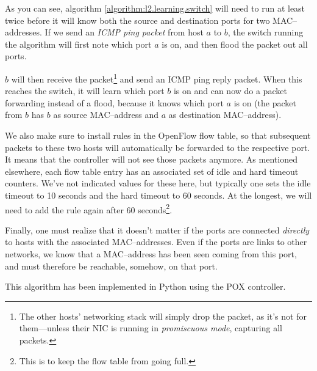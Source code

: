 As you can see, algorithm \ref{algorithm:l2.learning.switch} will need to
run at least twice before it will know both the source and destination ports
for two MAC--addresses.  If we send an \textit{\acs{ICMP} ping packet} from
host $a$ to $b$, the switch running the algorithm will first note which port
$a$ is on, and then flood the packet out all ports.

$b$ will then receive the packet\footnote{The other hosts' networking stack
will simply drop the packet, as it's not for them---unless their \acs{NIC} is
running in \textit{promiscuous mode}, capturing all packets.} and send an \acs{ICMP}
ping reply packet.  When this reaches the switch, it will learn which port
$b$ is on and can now do a packet forwarding instead of a flood, because it
knows which port $a$ is on (the packet from $b$ has $b$ as source
MAC--address and $a$ as destination MAC--address).

We also make sure to install rules in the OpenFlow flow table, so that
subsequent packets to these two hosts will automatically be forwarded to the
respective port.  It means that the controller will not see those packets
anymore.  As mentioned elsewhere, each flow table entry has an associated
set of idle and hard timeout counters.  We've not indicated values for these
here, but typically one sets the idle timeout to 10 seconds and the hard
timeout to 60 seconds.  At the longest, we will need to add the rule again
after 60 seconds\footnote{This is to keep the flow table from going full.}.

Finally, one must realize that it doesn't matter if the ports are connected
\textit{directly} to hosts with the associated MAC--addresses.  Even if the
ports are links to other networks, we know that a MAC--address has been seen
coming from this port, and must therefore be reachable, somehow, on that
port.

This algorithm has been implemented in Python using the POX controller.
